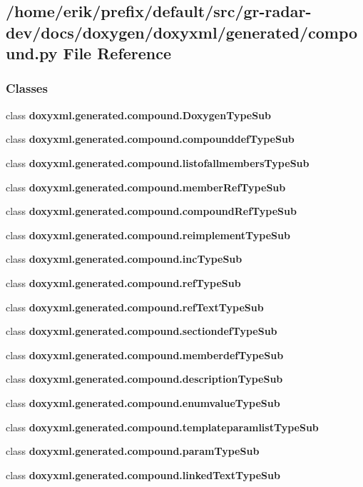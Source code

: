 \subsection{/home/erik/prefix/default/src/gr-\/radar-\/dev/docs/doxygen/doxyxml/generated/compound.py File Reference}
\label{compound_8py}
\subsubsection*{Classes}
\begin{DoxyCompactItemize}
\item 
class {\bf doxyxml.\+generated.\+compound.\+Doxygen\+Type\+Sub}
\item 
class {\bf doxyxml.\+generated.\+compound.\+compounddef\+Type\+Sub}
\item 
class {\bf doxyxml.\+generated.\+compound.\+listofallmembers\+Type\+Sub}
\item 
class {\bf doxyxml.\+generated.\+compound.\+member\+Ref\+Type\+Sub}
\item 
class {\bf doxyxml.\+generated.\+compound.\+compound\+Ref\+Type\+Sub}
\item 
class {\bf doxyxml.\+generated.\+compound.\+reimplement\+Type\+Sub}
\item 
class {\bf doxyxml.\+generated.\+compound.\+inc\+Type\+Sub}
\item 
class {\bf doxyxml.\+generated.\+compound.\+ref\+Type\+Sub}
\item 
class {\bf doxyxml.\+generated.\+compound.\+ref\+Text\+Type\+Sub}
\item 
class {\bf doxyxml.\+generated.\+compound.\+sectiondef\+Type\+Sub}
\item 
class {\bf doxyxml.\+generated.\+compound.\+memberdef\+Type\+Sub}
\item 
class {\bf doxyxml.\+generated.\+compound.\+description\+Type\+Sub}
\item 
class {\bf doxyxml.\+generated.\+compound.\+enumvalue\+Type\+Sub}
\item 
class {\bf doxyxml.\+generated.\+compound.\+templateparamlist\+Type\+Sub}
\item 
class {\bf doxyxml.\+generated.\+compound.\+param\+Type\+Sub}
\item 
class {\bf doxyxml.\+generated.\+compound.\+linked\+Text\+Type\+Sub}
\item 

\end{DoxyCompactItemize}
